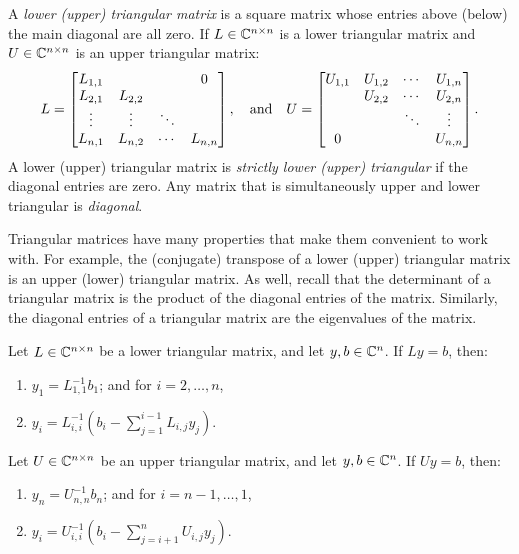 \begin{definition}
A {\em lower (upper) triangular matrix} is a square matrix whose entries above (below) the main diagonal are all zero. If $L\in\mathbb{C}^{n\times n}$ is a lower triangular matrix and $U\in\mathbb{C}^{n\times n}$ is an upper triangular matrix:
\[
L = \begin{bmatrix}
L_{1,1} & & & 0\\
L_{2,1} & L_{2,2}\\
\vdots & \vdots & \ddots\\
L_{n,1} & L_{n,2} & \cdots & L_{n,n}\\
\end{bmatrix},
\quad{\rm and}\quad
U = \begin{bmatrix}
U_{1,1} & U_{1,2} & \cdots & U_{1,n}\\
& U_{2,2} & \cdots & U_{2,n}\\
& & \ddots & \vdots\\
0 & & & U_{n,n}\\
\end{bmatrix}.
\]
A lower (upper) triangular matrix is {\em strictly lower (upper) triangular} if the diagonal entries are zero. Any matrix that is simultaneously upper and lower triangular is {\em diagonal}.
\end{definition}

Triangular matrices have many properties that make them convenient to work with. For example, the (conjugate) transpose of a lower (upper) triangular matrix is an upper (lower) triangular matrix. As well, recall that the determinant of a triangular matrix is the product of the diagonal entries of the matrix. Similarly, the diagonal entries of a triangular matrix are the eigenvalues of the matrix.

\begin{algorithm}
Let $L\in\mathbb{C}^{n\times n}$ be a lower triangular matrix, and let $y,b\in\mathbb{C}^n$. If $Ly = b$, then:
\begin{enumerate}
\item $y_1 = L_{1,1}^{-1}b_1$; and for $i=2,\ldots,n$,
\item $\displaystyle y_i = L_{i,i}^{-1}\left(b_i - \sum_{j=1}^{i-1}L_{i,j}y_j\right)$.
\end{enumerate}
\end{algorithm}

\begin{algorithm}
Let $U\in\mathbb{C}^{n\times n}$ be an upper triangular matrix, and let $y,b\in\mathbb{C}^n$. If $Uy = b$, then:
\begin{enumerate}
\item $y_n = U_{n,n}^{-1}b_n$; and for $i=n-1,\ldots,1$,
\item $\displaystyle y_i = U_{i,i}^{-1}\left(b_i - \sum_{j=i+1}^nU_{i,j}y_j\right)$.
\end{enumerate}
\end{algorithm}

